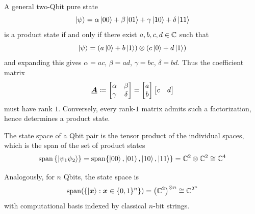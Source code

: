 \begin{remark}
A general two-Qbit pure state
\[
\ket{\psi}
=
\alpha\ket{00}+\beta\ket{01}+\gamma\ket{10}+\delta\ket{11}
\]
is a product state if and only if there exist \(a,b,c,d\in\mathbb{C}\) such that
\[
\ket{\psi}
=
(a\ket0+b\ket1)\otimes(c\ket0+d\ket1)
\]
and expanding this gives
\(
\alpha=ac\),  \(\beta=ad\),  \(\gamma=bc\),  \(\delta=bd 
\). 
Thus the coefficient matrix
\[
\matr{A} \coloneq %
\begin{bmatrix}
\alpha & \beta\\
\gamma & \delta
\end{bmatrix}
=
\begin{bmatrix}
a\\ b
\end{bmatrix}
\begin{bmatrix}
c & d
\end{bmatrix}
\]
must have rank \(1\). 
Conversely, every rank-\(1\) matrix admits such a factorization, hence determines a product state. 
\end{remark}

The state space of a Qbit pair is the tensor product of the individual spaces, which is the span of the set of product states
\[
\operatorname{span}{\{\ket{\psi_1 \psi_2}\}}
=
\operatorname{span}\{\ket{00},\ket{01},\ket{10},\ket{11}\}
=
\mathbb{C}^2 \otimes \mathbb{C}^2
\cong
\mathbb{C}^4
\]

Analogously, 
for \(n\) Qbits, the state space is
\[
\operatorname{span}(\{\ket{{\boldsymbol{x}}} : {\boldsymbol{x}} \in \{0,1\}^n\})
=
\left(\mathbb{C}^2\right)^{\otimes n}
\cong
\mathbb{C}^{2^n}
\]
with computational basis indexed by classical \(n\)-bit strings.

